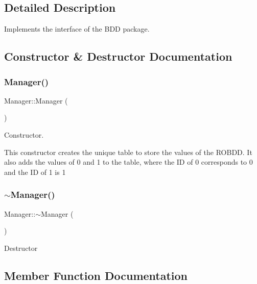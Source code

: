 \subsection{Detailed Description}
Implements the interface of the B\+DD package. 

\subsection{Constructor \& Destructor Documentation}
\mbox{\label{classClassProject_1_1Manager_a1658ff9f18e38ccd9cb8b0b371b9c20b}} 
\subsubsection{\texorpdfstring{Manager()}{Manager()}}
{\footnotesize\ttfamily Manager\+::\+Manager (\begin{DoxyParamCaption}{ }\end{DoxyParamCaption})}



Constructor. 

This constructor creates the unique table to store the values of the R\+O\+B\+DD. It also adds the values of \textquotesingle{}0\textquotesingle{} and \textquotesingle{}1\textquotesingle{} to the table, where the ID of \textquotesingle{}0\textquotesingle{} corresponds to 0 and the ID of \textquotesingle{}1\textquotesingle{} is 1 \mbox{\label{classClassProject_1_1Manager_a322cad25d7007438b3a043ad02253d29}} 
\subsubsection{\texorpdfstring{$\sim$\+Manager()}{~Manager()}}
{\footnotesize\ttfamily Manager\+::$\sim$\+Manager (\begin{DoxyParamCaption}{ }\end{DoxyParamCaption})}

Destructor 

\subsection{Member Function Documentation}
\mbox{\label{classClassProject_1_1Manager_a029fff4ef6650e4fd1f0ff37a69252de}} 
